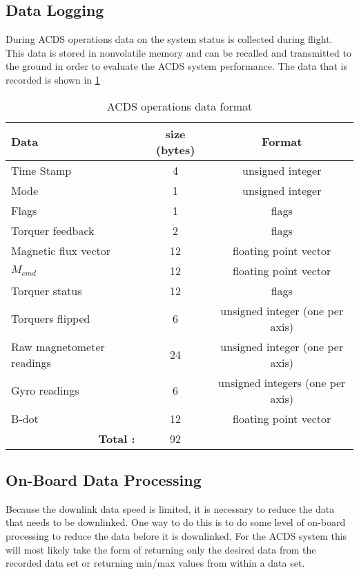 \subsection{Data Logging}

During \ac{ACDS} operations data on the system status is collected during flight. This data is stored in nonvolatile memory and can be recalled and transmitted to the ground in order to evaluate the \ac{ACDS} system performance. The data that is recorded is shown in \cref{tab:logdat}

\begin{table}[H]
    \centering
    \caption{\ac{ACDS} operations data format}
    \label{tab:logdat}
    \begin{tabular}{|l|c|c|}
        \hline
        Data&size (bytes)&Format\\
        \hline
        Time Stamp&4&unsigned integer\\
        \hline
        Mode&1&unsigned integer\\
        \hline
        Flags&1&flags\\
        \hline
        Torquer feedback&2&flags\\
        \hline
        Magnetic flux vector&12&floating point vector\\
        \hline
        $M_{cmd}$&12&floating point vector\\
        \hline
        Torquer status&12&flags\\
        \hline
        Torquers flipped&6&unsigned integer (one per axis)\\
        \hline
        Raw magnetometer readings&24&unsigned integer (one per axis)\\
        \hline
        Gyro readings&6&unsigned integers (one per axis)\\
        \hline
        B-dot&12&floating point vector\\
        \hline
        \multicolumn{1}{|r|}{\bfseries Total :}&92&\\
        \hline
    \end{tabular}
\end{table}

\subsection{On-Board Data Processing}

Because the downlink data speed is limited, it is necessary to reduce the data that needs to be downlinked. One way to do this is to do some level of on-board processing to reduce the data before it is downlinked. For the \ac{ACDS} system this will most likely take the form of returning only the desired data from the recorded data set or returning min/max values from within a data set. 

